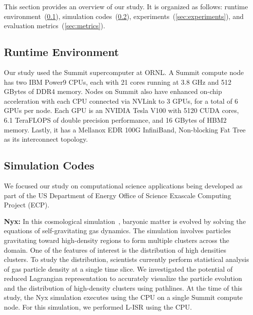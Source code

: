 This section provides an overview of our study. It is organized as follows: runtime environment~(\ref{sec:runtime}), simulation codes~(\ref{sec:simulations}), experiments~(\ref{sec:experiments}), and evaluation metrics~(\ref{sec:metrics}). %

\subsection{Runtime Environment}
\label{sec:runtime}
Our study used the Summit supercomputer at ORNL.
%
A Summit compute node has two IBM Power9 CPUs, each with 21 cores running at 3.8 GHz and 512 GBytes of DDR4 memory.
%
Nodes on Summit also have enhanced on-chip acceleration with each CPU connected via NVLink to 3 GPUs, for a total of 6 GPUs per node.
%
Each GPU is an NVIDIA Tesla V100 with 5120 CUDA cores, 6.1 TeraFLOPS of double precision performance, and 16 GBytes of HBM2 memory.
%
Lastly, it has a Mellanox EDR 100G InfiniBand, Non-blocking Fat Tree as its interconnect topology.

\subsection{Simulation Codes}
\label{sec:simulations}
We focused our study on 
computational science applications being developed as part of the US Department of Energy Office of Science Exascale Computing Project (ECP).
%
%

\textbf{Nyx:} In this cosmological simulation~\cite{almgren2013nyx}, baryonic matter is evolved by solving the equations of self-gravitating gas dynamics.
%
The simulation involves particles gravitating toward high-density regions to form multiple clusters across the domain. 
%
%
One of the features of interest is the distribution of high densities clusters.
%
To study the distribution, scientists currently perform statistical analysis of gas particle density at a single time slice.
%
We investigated the potential of reduced Lagrangian representation to accurately visualize the particle evolution and the distribution of high-density clusters using pathlines.
%
At the time of this study, the Nyx simulation executes using the CPU on a single Summit compute node.
%
For this simulation, we performed L-ISR using the CPU.


